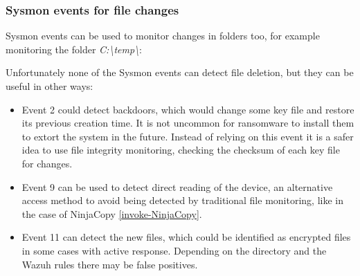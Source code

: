 \subsubsection{Sysmon events for file changes} \label{sysmon_events_file}
Sysmon events can be used to monitor changes in folders too, for example monitoring the folder \textit{C:{\textbackslash}temp{\textbackslash}}:

\linej
Unfortunately none of the Sysmon events can detect file deletion, but they can be useful in other ways:
\begin{itemize}
	\item Event 2 could detect backdoors, which would change some key file and restore its previous creation time. It is not uncommon for ransomware to install them to extort the system in the future. Instead of relying on this event it is a safer idea to use file integrity monitoring, checking the checksum of each key file for changes.
	\item Event 9 can be used to detect direct reading of the device, an alternative access method to avoid being detected by traditional file monitoring, like in the case of NinjaCopy \ref{invoke-NinjaCopy}.
	\item Event 11 can detect the new files, which could be identified as encrypted files in some cases with active response. Depending on the directory and the Wazuh rules there may be false positives.
\end{itemize}

